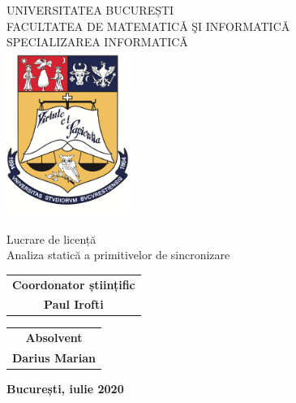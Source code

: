 \begin{titlepage}
    \begin{center}
        \Large
        UNIVERSITATEA BUCUREȘTI
        \\FACULTATEA DE MATEMATICǍ ŞI INFORMATICǍ
        \\SPECIALIZAREA INFORMATICǍ
        \vspace*{0.5cm}
        \\\includegraphics[width=4cm]{resources/blazon.png}

        \vspace*{2cm}
        \LARGE Lucrare de licență
        \\\huge Analiza statică a primitivelor de sincronizare
        
        \vfill
    \end{center}
    \large
    \hspace*{1.5cm}
    \begin{tabular}{c@{}}
        \textbf{Coordonator științific} \\
        \textbf{Paul Irofti}
    \end{tabular}
    \hfill
    \begin{tabular}{c@{}}
        \textbf{Absolvent} \\
        \textbf{Darius Marian}
    \end{tabular}
    \hspace*{1.5cm}
    \vspace*{5.2cm}
    \begin{center}
        \textbf{București, iulie 2020}
    \end{center}
\end{titlepage}